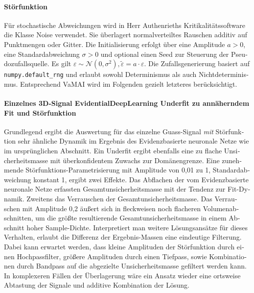 \begin{otherlanguage}{ngerman}
\paragraph{Störfunktion} Für stochastische Abweichungen wird in Herr Authenrieths Kritikalitätssoftware die Klasse Noise verwendet. Sie überlagert normalverteiltes Rauschen additiv auf Punktmengen oder Gitter. Die Initialisierung erfolgt über eine Amplitude \( a > 0 \), eine Standardabweichung \( \sigma > 0 \) und optional einen Seed zur Steuerung der Pseudozufallsquelle. Es gilt $\varepsilon \sim \mathcal{N}(0, \sigma^2), \tilde{\varepsilon} = a \cdot \varepsilon$. Die Zufallsgenerierung basiert auf \texttt{numpy.default\_rng} und erlaubt sowohl Determinismus als auch Nichtdeterminismus. Entsprechend VaMAI wird im Folgenden gezielt letzteres berücksichtigt.



\paragraph{Einzelnes 3D-Signal \gls{EvidentialDeepLearning} Underfit zu annäherndem Fit und Störfunktion} 

Grundlegend ergibt die Auswertung für das einzelne Guass-Signal \textit{mit} Störfunktion sehr ähnliche Dynamik im Ergebnis des \gls{Evidenzbasierte neuronale Netze} wie im ursprünglichen Abschnitt. Ein Underfit ergibt ebenfalls eine zu flache Unsicherheitsmasse mit überkonfidentem Zuwachs zur Domänengrenze. Eine zunehmende Störfunktions-Parametrisierung mit Amplitude von 0,01 zu 1, Standardabweichung konstant 1, ergibt zwei Effekte. Das Abflachen der vom \gls{Evidenzbasierte neuronale Netze} erfassten Gesamtunsicherheitsmasse mit der Tendenz zur Fit-Dynamik. Zweitens das Verrauschen der Gesamtunsicherheitsmasse. Das Verrauschen mit Amplitude 0,2 äußert sich in fleckweisen noch flacheren Volumenabschnitten, um die größte resultierende Gesamtunsicherheitsmasse in einem Abschnitt hoher Sample-Dichte. Interpretiert man weitere Lösungsansätze für dieses Verhalten, erlaubt die Differenz der Ergebnis-Massen eine eindeutige Filterung. Dabei kann erwartet werden, dass kleine Amplituden der Störfunktion durch einen Hochpassfilter, größere Amplituden durch einen Tiefpass, sowie Kombinationen durch Bandpass auf die abgezielte Unsicherheitsmasse gefiltert werden kann. In komplexeren Fällen der Überlagerung wäre ein Ansatz wieder eine ortsweise Abtastung der Signale und additive Kombination der Lösung. 




\end{otherlanguage}
